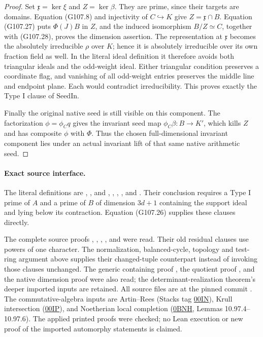 \begin{proof}
Set \(\mathfrak x=\ker\xi\) and \(Z=\ker\beta\).
They are prime, since their targets are domains.
Equation (G107.8) and injectivity of \(C\hookrightarrow K\)
give \(Z=\mathfrak x\cap B\).
Equation (G107.27) puts \(\Phi(J)B\) in \(Z\), and
the induced isomorphism \(B/Z\simeq C\), together
with (G107.28), proves the dimension assertion.
The representation at \(\mathfrak x\) becomes the
absolutely irreducible \(\rho\) over \(K\); hence it
is absolutely irreducible over its own fraction
field as well.
In the literal ideal definition it therefore avoids
both triangular ideals and the odd-weight ideal.
Either triangular condition preserves a coordinate
flag, and vanishing of all odd-weight entries
preserves the middle line and endpoint plane.
Each would contradict irreducibility.
This proves exactly the Type I clause of
\(\mathrm{SeedIn}\).

Finally the original native seed is still visible
on this component.  The factorization
\(\phi=\phi_C q\) gives the invariant seed map
\(\phi_C\beta:B\to K'\), which kills \(Z\) and
has composite \(\phi\) with \(\Phi\).
Thus the chosen full-dimensional invariant component
lies under an actual invariant lift of that same
native arithmetic seed.
\end{proof}

\paragraph{Exact source interface.}
The literal definitions are
, , and
,
, ,
, and
.
Their conclusion requires a Type I prime of \(A\)
and a prime of \(B\) of dimension \(3d+1\) containing
the support ideal and lying below its contraction.
Equation (G107.26) supplies these clauses directly.

The complete source proofs ,
, ,
, and 
were read.  Their old residual clauses use powers
of one character.  The normalization, balanced-cycle,
topology and test-ring argument above supplies
their changed-tuple counterpart instead of invoking
those clauses unchanged.
The generic containing proof
,
the quotient proof , and the
native dimension proof  were also read;
the determinant-realization theorem's deeper imported
inputs are retained.
All source files are at the pinned commit
.
The commutative-algebra inputs are Artin--Rees
(Stacks tag \href{https://stacks.math.columbia.edu/tag/00IN}{00IN}),
Krull intersection
(\href{https://stacks.math.columbia.edu/tag/00IP}{00IP}),
and Noetherian local completion
(\href{https://stacks.math.columbia.edu/tag/0BNH}{0BNH},
Lemmas 10.97.4--10.97.6).
The applied printed proofs were checked; no Lean
execution or new proof of the imported automorphy
statements is claimed.

